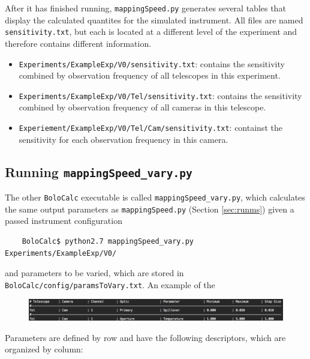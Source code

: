 \documentclass[11pt]{article} %
\begin{document}
After it has finished running, \texttt{mappingSpeed.py} generates several tables that display the calculated quantites for the simulated instrument. All files are named \texttt{sensitivity.txt}, but each is located at a different level of the experiment and therefore contains different information.

\begin{itemize}[noitemsep,topsep=0pt]
	\item \texttt{Experiments/ExampleExp/V0/sensitivity.txt}: contains the sensitivity combined by observation frequency of all telescopes in this experiment.
	\item \texttt{Experiments/ExampleExp/V0/Tel/sensitivity.txt}: contains the sensitivity combined by observation frequency of all cameras in this telescope.
	\item \texttt{Experiement/ExampleExp/V0/Tel/Cam/sensitivity.txt}: containst the sensitivity for each observation frequency in this camera.
\end{itemize}


\subsection{Running \texttt{mappingSpeed\_vary.py}}
\label{sec:runmsv}

The other \texttt{BoloCalc} executable is called \texttt{mappingSpeed\_vary.py}, which calculates the same output parameters as \texttt{mappingSpeed.py} (Section \ref{sec:runms}) given a passed instrument configuration

\begin{lstlisting}
	BoloCalc$ python2.7 mappingSpeed_vary.py Experiments/ExampleExp/V0/	
\end{lstlisting}

 and parameters to be varied, which are stored in \texttt{BoloCalc/config/paramsToVary.txt}. An example of the 

\begin{figure}[h!]
	\centering
	\includegraphics[width=1.0\textwidth]{ParamsToVary_Example}
\end{figure}

Parameters are defined by row and have the following descriptors, which are organized by column:
\end{document}
